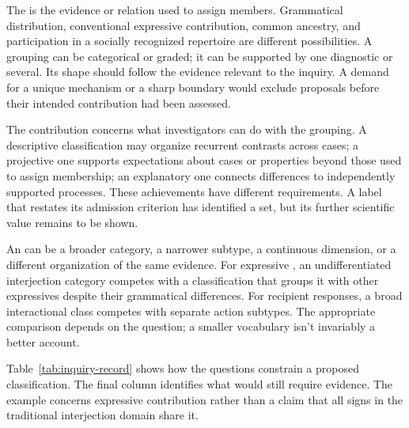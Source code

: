 \documentclass[12pt]{article}
\begin{document}
The  is the evidence or relation used to assign members.
Grammatical distribution, conventional expressive contribution, common
ancestry, and participation in a socially recognized repertoire are different
possibilities. A grouping can be categorical or graded; it can be supported
by one diagnostic or several. Its shape should follow the evidence relevant
to the inquiry. A demand for a unique mechanism or a sharp boundary would
exclude proposals before their intended contribution had been assessed.

The contribution concerns what investigators can do with the grouping. A
descriptive classification may organize recurrent contrasts across cases;
a projective one supports expectations about cases or properties beyond
those used to assign membership; an explanatory one connects differences
to independently supported processes. These achievements have different
requirements. A label that restates its admission criterion has identified
a set, but its further scientific value remains to be shown.

An  can be a broader category, a narrower subtype, a
continuous dimension, or a different organization of the same evidence.
For expressive , an undifferentiated interjection category
competes with a classification that groups it with other expressives despite
their grammatical differences. For recipient responses, a broad interactional
class competes with separate action subtypes. The appropriate comparison
depends on the question; a smaller vocabulary isn't invariably a better
account.

Table~\ref{tab:inquiry-record} shows how the questions constrain a proposed
classification. The final column identifies what would still require
evidence. The example concerns expressive contribution rather than a claim
that all signs in the traditional interjection domain share it.
\end{document}
